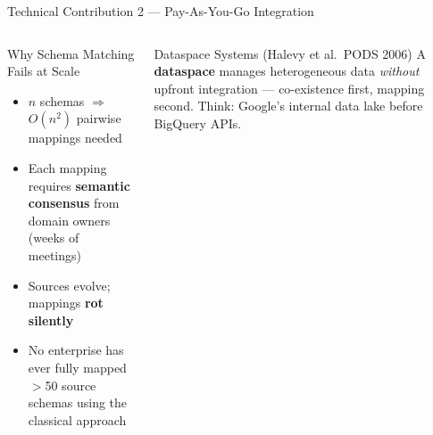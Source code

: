 \documentclass[aspectratio=169,10pt]{beamer}
\begin{document}
\begin{frame}{Technical Contribution 2 — Pay-As-You-Go Integration}
\begin{columns}[T]
      \begin{alertblock}{Why Schema Matching Fails at Scale}
        \begin{itemize}
          \item $n$ schemas $\Rightarrow$ $O(n^2)$ pairwise mappings needed
          \item Each mapping requires \textbf{semantic consensus}
                from domain owners (weeks of meetings)
          \item Sources evolve; mappings \textbf{rot silently}
          \item No enterprise has ever fully mapped $>$50 source schemas
                using the classical approach
        \end{itemize}
      \end{alertblock}
      \vspace{6pt}
      \begin{block}{Dataspace Systems (Halevy et al.\ PODS 2006)}
        A \textbf{dataspace} manages heterogeneous data
        \emph{without} upfront integration — co-existence first,
        mapping second.
        Think: Google's internal data lake before BigQuery APIs.
      \end{block}
  \end{columns}
\end{frame}
\end{document}
